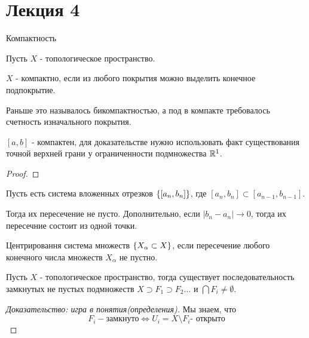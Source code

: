 \section{Лекция 4}


Компактность

Пусть $X$ - топологическое пространство.
\begin{definition}
    $X$ - компактно, если из любого покрытия можно выделить конечное подпокрытие.

    Раньше это называлось бикомпактностью, а под в компакте требовалось счетность изначального покрытия.
\end{definition}

\begin{example}
    $[a,b]$ - компактен, для доказательстве нужно использовать факт существования точной верхней грани у ограниченности подмножества $\mathbb{R}^1$.
\end{example}
\begin{proof}
\end{proof}

\begin{lemma}
    Пусть есть система вложенных отрезков $\left\{[a_n, b_n]\right\}$, где $[a_n, b_n] \subset [a_{n - 1}, b_{n - 1}]$.

    Тогда их пересечение не пусто. Дополнительно, если $|b_n - a_n| \to 0$, тогда их пересечние состоит из одной точки.
\end{lemma}

\begin{definition}
    Центрировання система множеств $\left\{X_{\alpha} \subset X\right\}$, если пересечение любого конечного числа множеств $X_{\alpha}$ не пустно.
\end{definition}

\begin{lemma}
    Пусть $X$ - топологическое пространство, тогда существует последовательность замкнутых не пустых подмножеств $X \supset F_1 \supset F_2 \ldots$ и $\bigcap F_i \neq \emptyset$.
\end{lemma}
\begin{proof}[Доказательство: игра в понятия(определения)]
    Мы знаем, что
    \[
        F_i - \text{замкнуто} \Leftrightarrow U_i = X \setminus F_i \text{- открыто}
    \]
\end{proof}

